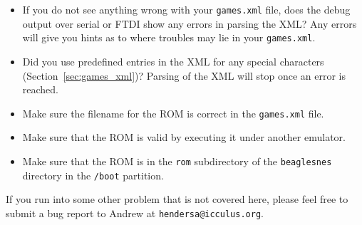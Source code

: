 
\begin{itemize}
\item If you do not see anything wrong with your \texttt{games.xml} file, does the debug output over serial or FTDI show any errors in parsing the XML? Any errors will give you hints as to where troubles may lie in your \texttt{games.xml}.  
\item Did you use predefined entries in the XML for any special characters (Section~\ref{sec:games_xml})? Parsing of the XML will stop once an error is reached.
\end{itemize}


\begin{itemize}
\item Make sure the filename for the ROM is correct in the \texttt{games.xml} file.
\item Make sure that the ROM is valid by executing it under another emulator.
\item Make sure that the ROM is in the \texttt{rom} subdirectory of the \texttt{beaglesnes} directory in the \texttt{/boot} partition.
\end{itemize}

\begin{updateWarn}
If you run into some other problem that is not covered here, please feel free to submit a bug report to Andrew at \texttt{hendersa@icculus.org}.
\end{updateWarn}

